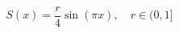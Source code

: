 \documentclass[preview,border=4pt]{standalone}
\begin{document}
\begin{equation}
    S(x) = \frac{r}{4}\sin(\pi x), \quad r \in (0,1]
\end{equation}
\end{document}
